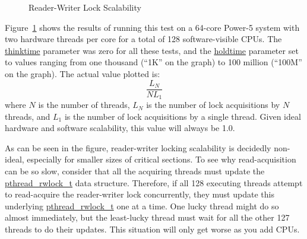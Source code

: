 \begin{figure}[tb]
\begin{center}
\end{center}
\caption{Reader-Writer Lock Scalability}
\label{fig:intro:Reader-Writer Lock Scalability}
\end{figure}

Figure~\ref{fig:intro:Reader-Writer Lock Scalability}
shows the results of running this test on a 64-core Power-5 system
with two hardware threads per core for a total of 128 software-visible
CPUs.
The \url{thinktime} parameter was zero for all these tests, and the
\url{holdtime} parameter set to values ranging from one thousand (``1K''
on the graph) to 100 million (``100M'' on the graph).
The actual value plotted is:
\begin{equation}
	\frac{L_N}{N L_1}
\end{equation}
where $N$ is the number of threads,
$L_N$ is the number of lock acquisitions by $N$ threads, and
$L_1$ is the number of lock acquisitions by a single thread.
Given ideal hardware and software scalability, this value will always
be 1.0.

As can be seen in the figure, reader-writer locking scalability is
decidedly non-ideal, especially for smaller sizes of critical
sections.
To see why read-acquisition can be so slow, consider
that all the acquiring threads must update the \url{pthread_rwlock_t}
data structure.
Therefore, if all 128 executing threads attempt to
read-acquire the reader-writer lock concurrently, they must update
this underlying \url{pthread_rwlock_t} one at a time.
One lucky thread might do so almost immediately, but the least-lucky
thread must wait for all the other 127 threads to do their updates.
This situation will only get worse as you add CPUs.

